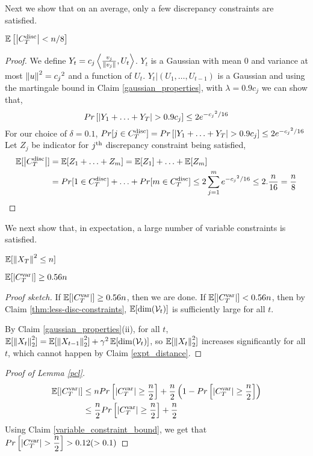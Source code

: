 Next we show that on an average, only a few discrepancy constraints are satisfied.
\begin{Claim}
\label{thm:less-disc-constraints}
$\mathbb{E}\left[\left\lvert C^{\mathrm{disc}}_T \right\rvert < n/8 \right]$
\end{Claim}
\begin{proof}
We define $Y_t = c_j\left\langle \frac{v_j}{\left\lVert v_j \right\rVert},U_t\right\rangle$. $Y_t$ is a Gaussian with mean 0 and variance at most $\left\lVert u \right\rVert^2 = {c_j}^2$ and a function of $U_t$.
$Y_t|(U_1,\hdots,U_{t-1})$ is a Gaussian and using the martingale bound in Claim \ref{gaussian_properties},  with $\lambda = 0.9c_j$ we can show that,
\[Pr\left[ \left\lvert Y_1+\hdots+Y_T \right\rvert > 0.9c_j \right] \leq 2e^{{-c_j}^2/16}\]
For our choice of $\delta = 0.1$, $Pr[j \in C^{\mathrm{disc}}_T] = Pr\left[ \left\lvert Y_1+\hdots+Y_T \right\rvert > 0.9c_j \right] \leq 2e^{{-c_j}^2/16}$
Let $Z_j$ be indicator for $j^{\textrm{th}}$ discrepancy constraint being satisfied,
\begin{align*}
    \mathbb{E}[\left\lvert C^{\mathrm{disc}}_T \right\rvert]
    &= \mathbb{E}[Z_1+\hdots+Z_m]
    = \mathbb{E}[Z_1] + \hdots + \mathbb{E}[Z_m]\\
    &= Pr[1 \in C^{\mathrm{disc}}_T] + \hdots + Pr[m \in C^{\mathrm{disc}}_T]
    \leq 2\sum_{j=1}^{m}{e^{{-c_j}^2/16}} \leq 2.\dfrac{n}{16} = \dfrac{n}{8}
\end{align*}
\end{proof}

We next show that, in expectation, a large number of variable constraints is satisfied.
\begin{Claim} \label{expt_distance}
$\mathbb{E}[\left\lVert X_T \right\rVert^2 \leq n]$
\end{Claim}
\begin{Claim} \label{variable_constraint_bound}
$\mathbb{E}[\left\lvert C^{\mathrm{var}}_T \right\rvert] \geq 0.56n$
\end{Claim}
\begin{proof}[Proof sketch]
If $\operatorname{\mathbb{E}}[\left\lvert C^{\mathrm{var}}_T \right\rvert] \ge 0.56n$, then we are done.
If $\operatorname{\mathbb{E}}[\left\lvert C^{\mathrm{var}}_T \right\rvert] < 0.56n$, then by Claim \ref{thm:less-disc-constraints},
$\operatorname{\mathbb{E}}[\dim(\mathcal{V}_t)]$ is sufficiently large for all $t$.

By Claim \ref{gaussian_properties}(ii), for all $t$,
$\operatorname{\mathbb{E}}[\left\lVert X_t \right\rVert_2^2] = \operatorname{\mathbb{E}}[\left\lVert X_{t-1} \right\rVert_2^2] + \gamma^2\operatorname{\mathbb{E}}[\dim(\mathcal{V}_t)]$,
so $\operatorname{\mathbb{E}}[\left\lVert X_t \right\rVert_2^2]$ increases significantly for all $t$,
which cannot happen by Claim \ref{expt_distance}.
\end{proof}

\begin{proof}[Proof of Lemma \ref{pcl}]
\begin{align*}
  \mathbb{E}[\left\lvert C^{\mathrm{var}}_T \right\rvert]
&\leq nPr\left[\left\lvert C^{\mathrm{var}}_T \right\rvert \geq \dfrac{n}{2}\right] + \dfrac{n}{2}\left(1- Pr\left[\left\lvert C^{\mathrm{var}}_T \right\rvert \geq \dfrac{n}{2}\right] \right )\\
&\leq \dfrac{n}{2}Pr\left[\left\lvert C^{\mathrm{var}}_T \right\rvert \geq \dfrac{n}{2}\right]  + \dfrac{n}{2}
\end{align*}
Using Claim \ref{variable_constraint_bound}, we get that $Pr\left[\left\lvert C^{\mathrm{var}}_T \right\rvert > \dfrac{n}{2}\right] > 0.12 (> 0.1)$
\end{proof}

